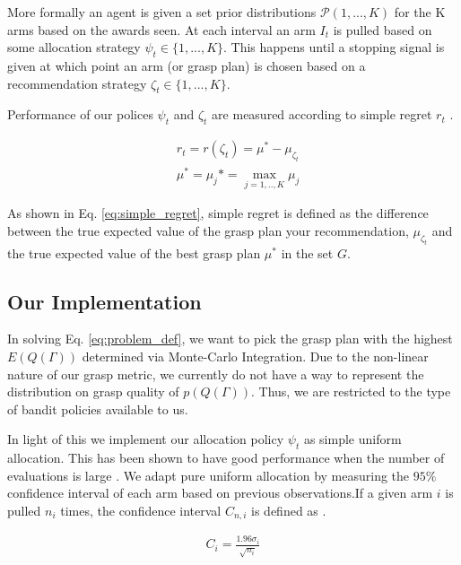 \documentclass[letterpaper, 10 pt, conference]{ieeeconf}  %
\begin{document}
More formally an agent is given a set prior distributions $\mathcal{P}(1,...,K)$ for the K arms based on the awards seen.%
 At each interval an arm $I_t$ is pulled based on some allocation strategy $\psi_t \in \lbrace 1,...,K \rbrace$. This happens until a stopping signal is given at which point an arm (or grasp plan) is chosen based on a recommendation strategy $\zeta_t \in \lbrace 1,...,K \rbrace$. 

Performance of our polices $\psi_t$ and $\zeta_t$ are measured according to simple regret $r_t$ \cite{bubeck2009pure}. 

\vspace{-2ex}
\begin{align}\label{eq:simple_regret}
&r_t = r(\zeta_t) = \mu^* - \mu_{\zeta_t} \\
&\mu^* = \mu_j* = \max_{j=1,..,K} \mu_j
\end{align}



As shown in Eq. \ref{eq:simple_regret}, simple regret is defined as the difference between the true expected value of the grasp plan your recommendation, $\mu_{\zeta_t}$ and the true expected value of the best grasp plan $\mu^*$ in the set $G$. 

\subsection{Our Implementation}
In solving Eq. \ref{eq:problem_def}, we want to pick the grasp plan with the highest $E(Q(\Gamma))$ determined via Monte-Carlo Integration. Due to the non-linear nature of our grasp metric, we currently do not have a way to represent the distribution on grasp quality of $p(Q(\Gamma))$. Thus, we are restricted to the type of bandit policies available to us.

In light of this we implement our allocation policy $\psi_t$ as simple uniform allocation. This has been shown to have good performance when the number of evaluations is large \cite{bubeck2009pure}. We adapt pure uniform allocation by measuring the $95\%$ confidence interval of each arm based on previous observations.If a given arm $i$ is pulled $n_i$ times, the confidence interval $C_{n, i}$ is defined as \cite{caflisch1998monte}.

\vspace{-2ex}
\begin{align}
C_{ i} = \frac{1.96 \sigma_i}{\sqrt{n_i}}
\end{align}
\end{document}
